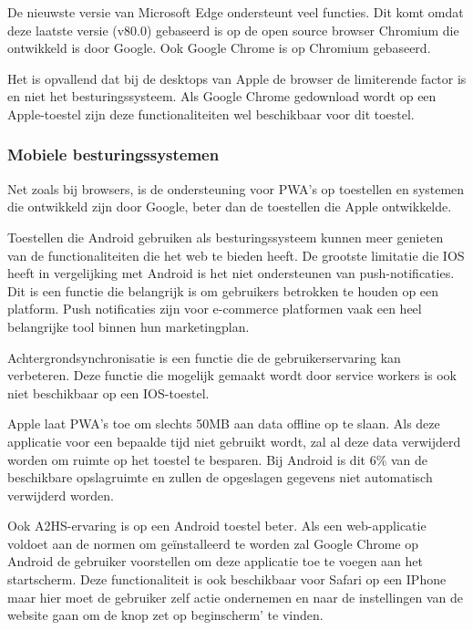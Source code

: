 De nieuwste versie van Microsoft Edge ondersteunt veel functies. Dit komt omdat deze laatste versie (v80.0) gebaseerd is op de open source browser Chromium die ontwikkeld is door Google. Ook Google Chrome is op Chromium gebaseerd.

Het is opvallend dat bij de desktops van Apple de browser de limiterende factor is en niet het besturingssysteem. Als Google Chrome gedownload wordt op een Apple-toestel zijn deze functionaliteiten wel beschikbaar voor dit toestel.


\subsubsection{Mobiele besturingssystemen }

Net zoals bij browsers, is de ondersteuning voor PWA’s op toestellen en systemen die ontwikkeld zijn door Google, beter dan de toestellen die Apple ontwikkelde.

Toestellen die Android gebruiken als besturingssysteem kunnen meer genieten van de functionaliteiten die het web te bieden heeft.
De grootste limitatie die IOS heeft in vergelijking met Android is het niet ondersteunen van push-notificaties. Dit is een functie die belangrijk is om gebruikers betrokken te houden op een platform. Push notificaties zijn voor e-commerce platformen vaak een heel belangrijke tool binnen hun marketingplan.
\autocite{Anastasia2017}

Achtergrondsynchronisatie is een functie die de gebruikerservaring kan verbeteren. Deze functie die mogelijk gemaakt wordt door service workers is ook niet beschikbaar op een IOS-toestel.

Apple laat PWA’s toe om slechts 50MB aan data offline op te slaan. Als deze applicatie voor een bepaalde tijd niet gebruikt wordt, zal al deze data verwijderd worden om ruimte op het toestel te besparen. Bij Android is dit 6\% van de beschikbare opslagruimte en zullen de opgeslagen gegevens niet automatisch verwijderd worden.

Ook A2HS-ervaring is op een Android toestel beter. Als een web-applicatie voldoet aan de normen om geïnstalleerd te worden zal Google Chrome op Android de gebruiker voorstellen om deze applicatie toe te voegen aan het startscherm. Deze functionaliteit is ook beschikbaar voor Safari op een IPhone maar hier moet de gebruiker zelf actie ondernemen en naar de instellingen van de website gaan om de knop zet op beginscherm’ te vinden.

